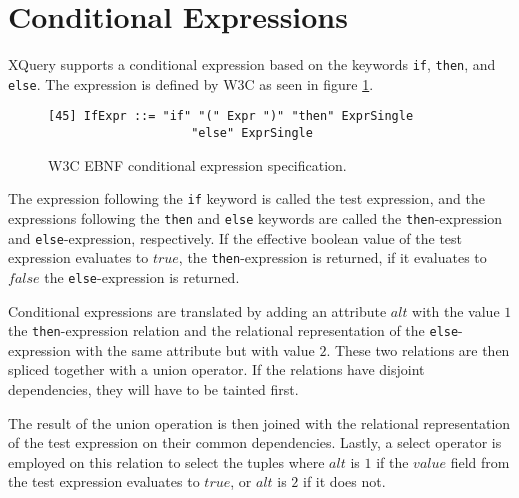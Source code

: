 \section{Conditional Expressions}
\label{sect:trans:TD:ifThenElse}
XQuery supports a conditional expression based on the keywords \texttt{if}, \texttt{then}, and \texttt{else}. The
expression is defined by W3C as seen in figure \ref{fig:trans:TD:condEBNF}.

\begin{figure}[h]
\begin{Verbatim}
[45] IfExpr ::= "if" "(" Expr ")" "then" ExprSingle 
                    "else" ExprSingle
\end{Verbatim}
\label{fig:trans:TD:condEBNF}
\caption{W3C EBNF conditional expression specification.}
\end{figure}

The expression following the \texttt{if} keyword is called the test expression, and the expressions following the
\texttt{then} and \texttt{else} keywords are called the \texttt{then}-expression and \texttt{else}-expression,
respectively. If the effective boolean value of the test expression evaluates to $true$, the
\texttt{then}-expression is returned, if it evaluates to $false$ the \texttt{else}-expression is returned.

Conditional expressions are translated by adding an attribute $alt$ with the value $1$ the
\texttt{then}-expression relation and the relational representation of the \texttt{else}-expression with the same
attribute but with value $2$. These two relations are then spliced together with a \textsf{union} operator. If the
relations have disjoint dependencies, they will have to be tainted first.

The result of the \textsf{union} operation is then joined with the relational representation of the test
expression on their common dependencies. Lastly, a \textsf{select} operator is employed on this relation to select
the tuples where $alt$ is $1$ if the $value$ field from the test expression evaluates to $true$, or $alt$ is $2$
if it does not.


